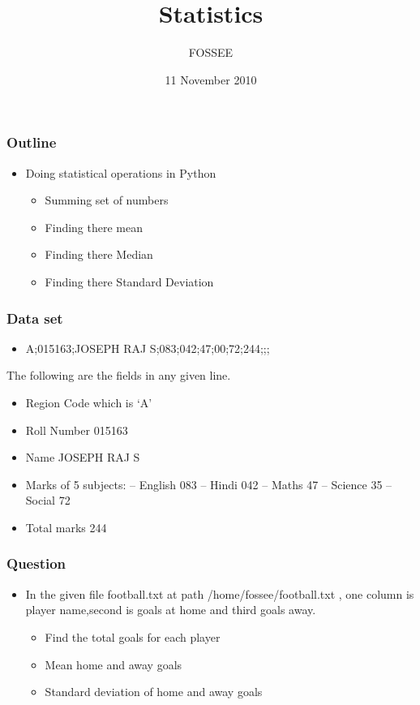 \documentclass[presentation]{beamer}
\title{Statistics}
\author{FOSSEE}
\date{11 November 2010}
\begin{document}
\maketitle










\begin{frame}
\frametitle{Outline}
\label{sec-1}

\begin{itemize}
\item Doing statistical operations in Python

\begin{itemize}
\item Summing set of numbers
\item Finding there mean
\item Finding there Median
\item Finding there Standard Deviation
\end{itemize}

\end{itemize}
\end{frame}
\begin{frame}
\frametitle{Data set}
\label{sec-2}

\begin{itemize}
\item A;015163;JOSEPH RAJ S;083;042;47;00;72;244;;;
\end{itemize}


  The following are the fields in any given line.
\begin{itemize}
\item Region Code which is `A'
\item Roll Number 015163
\item Name JOSEPH RAJ S
\item Marks of 5 subjects: -- English 083 -- 
     Hindi 042 -- Maths 47 --
     Science 35 -- Social 72
\item Total marks 244
\end{itemize}
\end{frame}
\begin{frame}
\frametitle{Question}
\label{sec-3}

\begin{itemize}
\item In the given file football.txt at path /home/fossee/football.txt , 
    one column is player name,second is goals at home 
    and third goals away.

\begin{itemize}
\item Find the total goals for each player
\item Mean home and away goals
\item Standard deviation of home and away goals
\end{itemize}

\end{itemize}
\end{frame}
\end{document}
